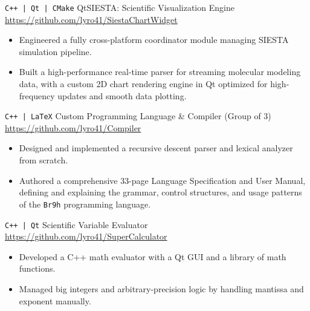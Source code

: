 \documentclass[9pt]{developercv} %
\begin{document}
\vspace{-15pt}
\begin{entrylist}
    \entry
		{\texttt{C++ | Qt | CMake}}
		{QtSIESTA: Scientific Visualization Engine}
		{\href{https://github.com/lyro41/SiestaChartWidget}{https://github.com/lyro41/SiestaChartWidget}}
		{\vspace{-10pt}
        \begin{itemize}[noitemsep,topsep=0pt,parsep=0pt,partopsep=0pt, leftmargin=-1pt]
            \item Engineered a fully cross-platform coordinator module managing SIESTA simulation pipeline.
            \item Built a high-performance real-time parser for streaming molecular modeling data, with a custom 2D chart rendering engine in Qt optimized for high-frequency updates and smooth data plotting.
        \end{itemize}}
    \entry
		{\texttt{C++ | LaTeX}}
		{Custom Programming Language \& Compiler (Group of 3)}
		{\href{https://github.com/lyro41/Compiler}{https://github.com/lyro41/Compiler}}
		{\vspace{-10pt}
        \begin{itemize}[noitemsep,topsep=0pt,parsep=0pt,partopsep=0pt, leftmargin=-1pt]
            \item Designed and implemented a recursive descent parser and lexical analyzer from scratch.
            \item Authored a comprehensive 33-page Language Specification and User Manual, defining and explaining the grammar, control structures, and usage patterns of the \texttt{Br9h} programming language.
        \end{itemize}}
	\entry
		{\texttt{C++ | Qt}}
		{Scientific Variable Evaluator}
	    {\href{https://github.com/lyro41/SuperCalculator}{https://github.com/lyro41/SuperCalculator}}
		{\vspace{-10pt}
        \begin{itemize}[noitemsep,topsep=0pt,parsep=0pt,partopsep=0pt, leftmargin=-1pt]
            \item Developed a C++ math evaluator with a Qt GUI and a library of math functions. 
            \item Managed big integers and arbitrary-precision logic by handling mantissa and exponent manually.

\end{itemize}}
\end{entrylist}
\end{document}
